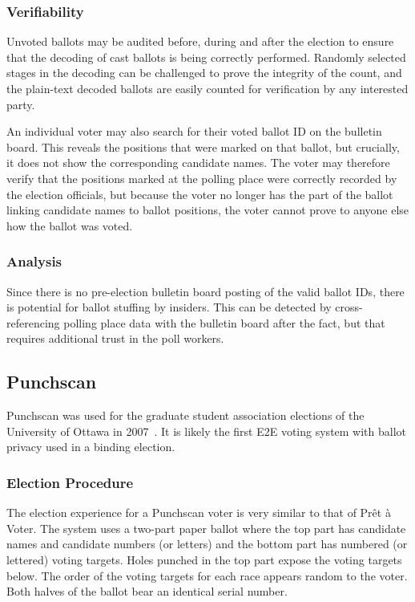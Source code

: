 \subsubsection{Verifiability}

Unvoted ballots may be audited before, during and after the election
to ensure that the decoding of cast ballots is being correctly
performed. Randomly selected stages in the decoding can be challenged
to prove the integrity of the count, and the plain-text decoded
ballots are easily counted for verification by any interested party.

An individual voter may also search for their voted ballot ID on the
bulletin board. This reveals the positions that were marked on that
ballot, but crucially, it does not show the corresponding candidate
names. The voter may therefore verify that the positions marked at the
polling place were correctly recorded by the election officials, but
because the voter no longer has the part of the ballot linking
candidate names to ballot positions, the voter cannot prove to anyone
else how the ballot was voted.

\subsubsection{Analysis}

Since there is no pre-election bulletin board posting of the valid
ballot IDs, there is potential for ballot stuffing by
insiders. This can be detected by cross-referencing polling place
data with the bulletin board after the fact, but that requires
additional trust in the poll workers.

\subsection{Punchscan~\cite{popoveniuc2006,popoveniuc2010punchscan}}
\label{sec:punchscan}

Punchscan was used for the graduate student association elections of
the University of Ottawa in 2007~\cite{essex2007}. It is likely
the first E2E voting system with ballot privacy used in a binding
election.

\subsubsection{Election Procedure}

The election experience for a Punchscan voter is very similar to that
of Prêt à Voter. The system uses a two-part paper ballot where the top
part has candidate names and candidate numbers (or letters) and the
bottom part has numbered (or lettered) voting targets. Holes punched
in the top part expose the voting targets below. The order of the
voting targets for each race appears random to the voter. Both halves
of the ballot bear an identical serial number.

